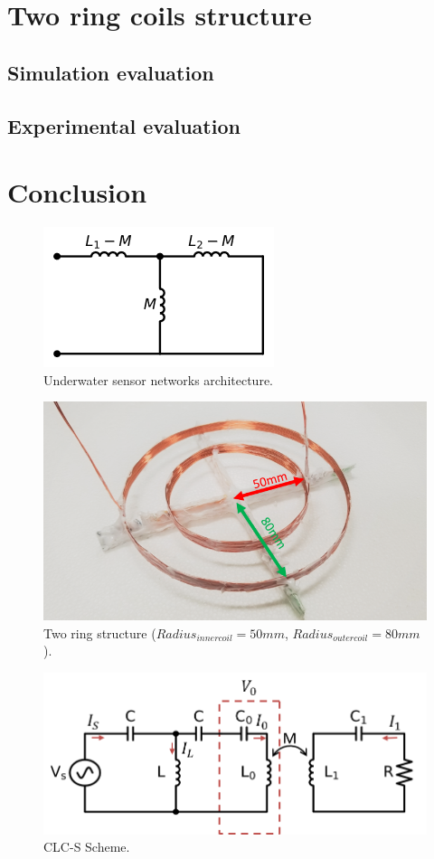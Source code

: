 \section{Two ring coils structure}
\subsection{Simulation evaluation}
\subsection{Experimental evaluation}


\section{Conclusion}


\begin{figure}[htbp]
    \centering
    \includegraphics[width=0.4\linewidth]{images/3_mutual_inductance.png}
    \caption{Underwater sensor networks architecture.}
    \label{fig:3_mutual_inductance}
\end{figure}

\begin{figure}[htbp]
    \centering
    \includegraphics[width=0.7\linewidth]{images/3_two_ring_coil_5cm_8cm.png}
    \caption{Two ring structure ($Radius_{inner coil}=50mm$, $Radius_{outer coil}=80mm$).}
    \label{fig:3_two_ring_coil_5cm_8cm}
\end{figure}

\begin{figure}[htbp]
    \centering
    \includegraphics[width=0.8\linewidth]{images/3_clc_s_scheme.png}
    \caption{CLC-S Scheme.}
    \label{fig:3_clc_s_scheme}
\end{figure}